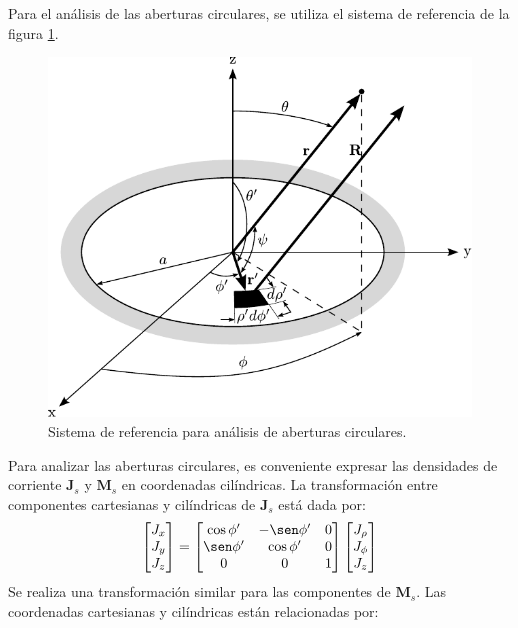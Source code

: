 Para el análisis de las aberturas circulares, se utiliza el sistema de referencia de la figura \ref{fig_fundamentos:14}.
\begin{figure} [H]
\centering 
\includegraphics[scale = 1]{Figures/Fundamentos/fundamentos_14.pdf}
\caption{Sistema de referencia para análisis de aberturas circulares.}
\label{fig_fundamentos:14}
\end{figure}
Para analizar las aberturas circulares, es conveniente expresar las densidades de corriente $\mathbf{J}_s$ y $\mathbf{M}_s$ en coordenadas cilíndricas. La transformación entre componentes cartesianas y cilíndricas de $\mathbf{J}_s$ está dada por:
\begin{align}
\begin{bmatrix}
J_x\\
J_y\\
J_z
\end{bmatrix}
=
\begin{bmatrix}
\cos\phi ' & -\sen\phi ' & 0\\
\sen\phi ' & \cos\phi ' & 0\\
0 & 0 & 1
\end{bmatrix}
\begin{bmatrix}
J_{\rho}\\
J_{\phi}\\
J_z
\end{bmatrix}
\label{ec_fundamentos:62}
\end{align}
Se realiza una transformación similar para las componentes de $\mathbf{M}_s$. Las coordenadas cartesianas y cilíndricas están relacionadas por:

